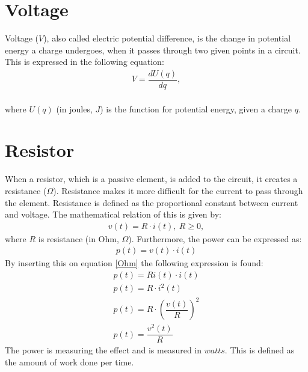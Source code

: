 \section{Voltage}
Voltage ($V$), also called electric potential difference, is the change in potential energy a charge undergoes, when it passes through two given points in a circuit. This is expressed in the following equation:
\begin{align}
	V=\dfrac{dU(q)}{dq},
\end{align}
\\
where $U(q)$ (in joules, $J$) is the function for potential energy, given a charge $q$.

\section{Resistor}
When a resistor, which is a passive element, is added to the circuit, it creates a resistance ($\Omega$). Resistance makes it more difficult for the current to pass through the element. Resistance is defined as the proportional constant between current and voltage. The mathematical relation of this is given by:
\begin{align} 
\label{Ohm}
v(t)=R\cdot i(t),\ R\geq0,
\end{align}
where $R$ is resistance (in Ohm, $\Omega$). Furthermore, the power can be expressed as: \cite[p. 25]{bcircuit} 
\begin{align} 
\label{power}
p(t)=v(t)\cdot i(t)
\end{align}
By inserting this on equation \ref{Ohm} the following expression is found:
\begin{align}
\label{resistor:power}
p(t)=Ri(t)\cdot i(t) \\
p(t)=R \cdot i^2(t) \\
p(t)=R \cdot \left(\dfrac{v(t)}{R} \right)^2 \\
p(t)=\dfrac{v^2(t)}{R}
\end{align}
The power is measuring the effect and is measured in $watts$. This is defined as the amount of work done per time. 
